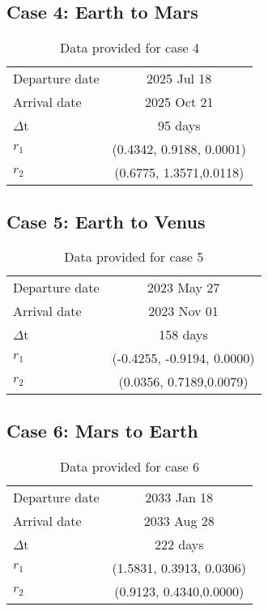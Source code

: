 \subsection{Case 4: Earth to Mars}

\begin{table}[H]
\centering
\begin{tabular}{|lc|}
\hline
Departure date              & 2025 Jul 18                \\ 
Arrival date                & 2025 Oct 21 \\ 
$\Delta$t                    & 95 days                   \\ 
$r_1$                          & (0.4342, 0.9188, 0.0001)  \\ 
$r_2$                          & (0.6775, 1.3571,0.0118)   \\ \hline
\end{tabular}
\caption{Data provided for case 4}
\end{table}

\subsection{Case 5: Earth to Venus}
 \begin{table}[H]
\centering
\begin{tabular}{|lc|}
\hline
Departure date              & 2023 May 27                \\ 
Arrival date                & 2023 Nov 01 \\ 
$\Delta$t                    & 158 days                   \\ 
$r_1$                          & (-0.4255, -0.9194, 0.0000)  \\ 
$r_2$                          & (0.0356, 0.7189,0.0079)   \\ \hline
\end{tabular}
\caption{Data provided for case 5}
\end{table}

\subsection{Case 6: Mars to Earth}

\begin{table}[H]
\centering
\begin{tabular}{|lc|}
\hline
Departure date              & 2033 Jan 18                \\ 
Arrival date                & 2033 Aug 28 \\ 
$\Delta$t                    & 222 days                   \\ 
$r_1$                          & (1.5831, 0.3913, 0.0306)  \\ 
$r_2$                          & (0.9123, 0.4340,0.0000)   \\ \hline
\end{tabular}
\caption{Data provided for case 6}
\end{table}
